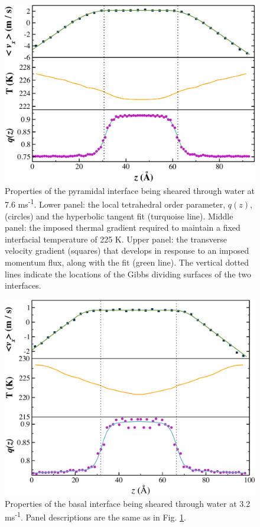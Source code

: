\documentclass[journal = jpccck, manuscript = suppinfo]{achemso}
\begin{document}
\begin{figure}
\includegraphics[width=\linewidth]{Pyr_comic_strip}
\caption{\label{fig:pyrComic} Properties of the pyramidal
  interface being sheared through water at 7.6
  ms\textsuperscript{-1}. Lower panel: the local tetrahedral order
  parameter, $q(z)$, (circles) and the hyperbolic tangent fit
  (turquoise line).  Middle panel: the imposed thermal gradient
  required to maintain a fixed interfacial temperature of 225 K. Upper
  panel: the transverse velocity gradient (squares) that develops in
  response to an imposed momentum flux, along with the fit (green
  line). The vertical dotted lines indicate the locations of the Gibbs
  dividing surfaces of the two interfaces.}
\end{figure}

\begin{figure}
\includegraphics[width=\linewidth]{Bas_comic_strip}
\caption{\label{fig:bComic} Properties of the basal interface being
  sheared through water at 3.2 ms\textsuperscript{-1}.  Panel
  descriptions are the same as in Fig. \ref{fig:pyrComic}.}
\end{figure}
\end{document}
